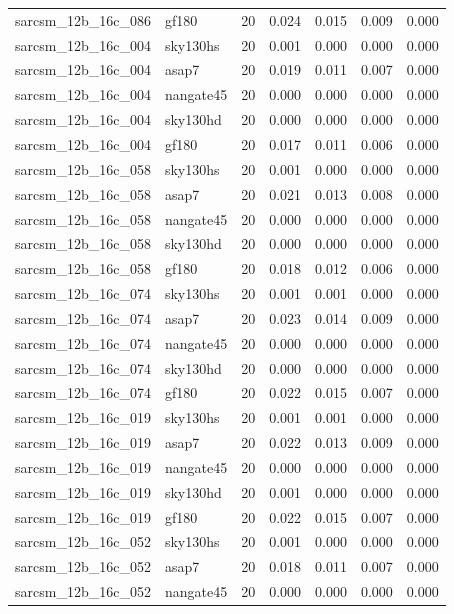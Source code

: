 \begin{tabular}{llrrrrr}
sarcsm\_12b\_16c\_086 & gf180 & 20 & 0.024 & 0.015 & 0.009 & 0.000 \\
sarcsm\_12b\_16c\_004 & sky130hs & 20 & 0.001 & 0.000 & 0.000 & 0.000 \\
sarcsm\_12b\_16c\_004 & asap7 & 20 & 0.019 & 0.011 & 0.007 & 0.000 \\
sarcsm\_12b\_16c\_004 & nangate45 & 20 & 0.000 & 0.000 & 0.000 & 0.000 \\
sarcsm\_12b\_16c\_004 & sky130hd & 20 & 0.000 & 0.000 & 0.000 & 0.000 \\
sarcsm\_12b\_16c\_004 & gf180 & 20 & 0.017 & 0.011 & 0.006 & 0.000 \\
sarcsm\_12b\_16c\_058 & sky130hs & 20 & 0.001 & 0.000 & 0.000 & 0.000 \\
sarcsm\_12b\_16c\_058 & asap7 & 20 & 0.021 & 0.013 & 0.008 & 0.000 \\
sarcsm\_12b\_16c\_058 & nangate45 & 20 & 0.000 & 0.000 & 0.000 & 0.000 \\
sarcsm\_12b\_16c\_058 & sky130hd & 20 & 0.000 & 0.000 & 0.000 & 0.000 \\
sarcsm\_12b\_16c\_058 & gf180 & 20 & 0.018 & 0.012 & 0.006 & 0.000 \\
sarcsm\_12b\_16c\_074 & sky130hs & 20 & 0.001 & 0.001 & 0.000 & 0.000 \\
sarcsm\_12b\_16c\_074 & asap7 & 20 & 0.023 & 0.014 & 0.009 & 0.000 \\
sarcsm\_12b\_16c\_074 & nangate45 & 20 & 0.000 & 0.000 & 0.000 & 0.000 \\
sarcsm\_12b\_16c\_074 & sky130hd & 20 & 0.000 & 0.000 & 0.000 & 0.000 \\
sarcsm\_12b\_16c\_074 & gf180 & 20 & 0.022 & 0.015 & 0.007 & 0.000 \\
sarcsm\_12b\_16c\_019 & sky130hs & 20 & 0.001 & 0.001 & 0.000 & 0.000 \\
sarcsm\_12b\_16c\_019 & asap7 & 20 & 0.022 & 0.013 & 0.009 & 0.000 \\
sarcsm\_12b\_16c\_019 & nangate45 & 20 & 0.000 & 0.000 & 0.000 & 0.000 \\
sarcsm\_12b\_16c\_019 & sky130hd & 20 & 0.001 & 0.000 & 0.000 & 0.000 \\
sarcsm\_12b\_16c\_019 & gf180 & 20 & 0.022 & 0.015 & 0.007 & 0.000 \\
sarcsm\_12b\_16c\_052 & sky130hs & 20 & 0.001 & 0.000 & 0.000 & 0.000 \\
sarcsm\_12b\_16c\_052 & asap7 & 20 & 0.018 & 0.011 & 0.007 & 0.000 \\
sarcsm\_12b\_16c\_052 & nangate45 & 20 & 0.000 & 0.000 & 0.000 & 0.000 \\

\end{tabular}
